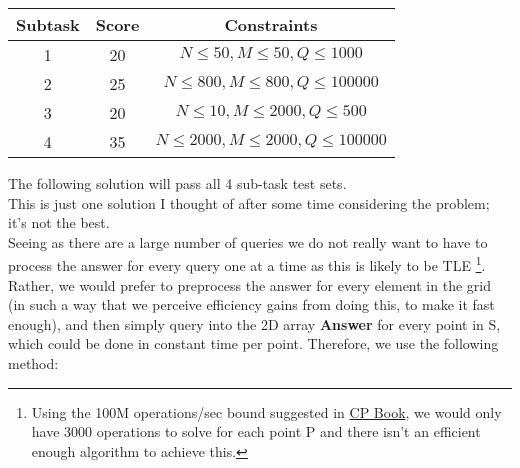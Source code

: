 \documentclass{article}
\begin{document}
\begin{center}
\begin{tabular}{ |c|c|c| } 
 \hline
 Subtask & Score & Constraints \\ 
 \hline
 1 & 20 & $N \leq 50, M \leq 50, Q \leq 1000 $ \\ 
 \hline 
 2 & 25 & $N \leq 800, M \leq 800, Q \leq 100000 $ \\ 
 \hline
 3 & 20 & $N \leq 10, M \leq 2000, Q \leq 500 $ \\ 
 \hline 
 4 & 35 & $N \leq 2000, M \leq 2000, Q \leq 100000 $ \\ 
 \hline 
\end{tabular}
\end{center}


\noindent The following solution will pass all 4 sub-task test sets. \\

\noindent This is just one solution I thought of after some time considering the problem; it's not the best. \\

\noindent Seeing as there are a large number of queries we do not really want to have to process the answer for every query one at a time as this is likely to be TLE \footnote{Using the 100M operations/sec bound suggested in \href{https://cpbook.net}{CP Book}, we would only have 3000 operations to solve for each point P and there isn't an efficient enough algorithm to achieve this.}. Rather, we would prefer to preprocess the answer for every element in the grid (in such a way that we perceive efficiency gains from doing this, to make it fast enough), and then simply query into the 2D array \textbf{Answer} for every point in S, which could be done in constant time per point. Therefore, we use the following method:
\end{document}
